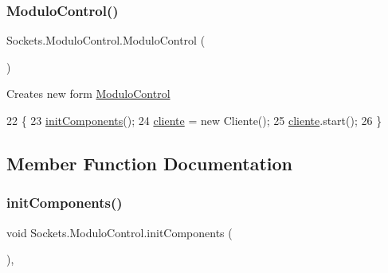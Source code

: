 \subsubsection{\texorpdfstring{Modulo\+Control()}{ModuloControl()}}
{\footnotesize\ttfamily Sockets.\+Modulo\+Control.\+Modulo\+Control (\begin{DoxyParamCaption}{ }\end{DoxyParamCaption})\hspace{0.3cm}{\ttfamily [inline]}}

Creates new form \mbox{\hyperlink{class_sockets_1_1_modulo_control}{Modulo\+Control}} 
\begin{DoxyCode}
22                            \{
23         \mbox{\hyperlink{class_sockets_1_1_modulo_control_a89b520fe4d92108d39252c5182434710}{initComponents}}();
24         \mbox{\hyperlink{class_sockets_1_1_modulo_control_ae24879f5b211f987267a002a09329415}{cliente}} = \textcolor{keyword}{new} Cliente();
25         \mbox{\hyperlink{class_sockets_1_1_modulo_control_ae24879f5b211f987267a002a09329415}{cliente}}.start();
26     \}
\end{DoxyCode}


\subsection{Member Function Documentation}
\mbox{\label{class_sockets_1_1_modulo_control_a89b520fe4d92108d39252c5182434710}} 
\subsubsection{\texorpdfstring{init\+Components()}{initComponents()}}
{\footnotesize\ttfamily void Sockets.\+Modulo\+Control.\+init\+Components (\begin{DoxyParamCaption}{ }\end{DoxyParamCaption})\hspace{0.3cm}{\ttfamily [inline]}, {\ttfamily [private]}}

